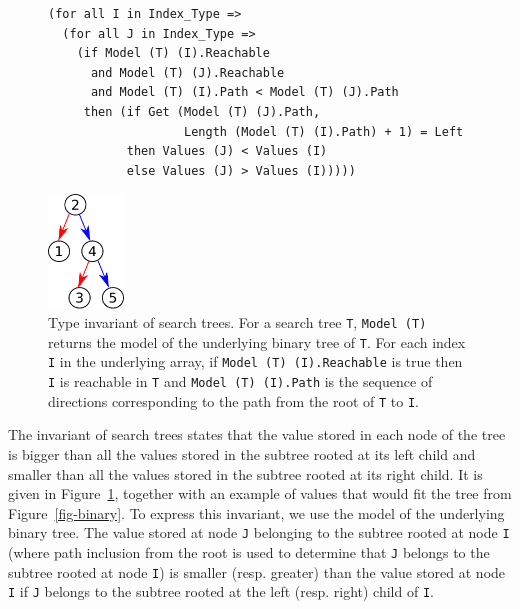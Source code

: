 \documentclass{llncs}
\begin{document}
\begin{figure}[ht]
\hspace{-3mm}
\begin{minipage}[c]{.79\linewidth}
\begin{small}
\begin{lstlisting}
(for all I in Index_Type =>
  (for all J in Index_Type =>
    (if Model (T) (I).Reachable
      and Model (T) (J).Reachable
      and Model (T) (I).Path < Model (T) (J).Path
     then (if Get (Model (T) (J).Path,
                   Length (Model (T) (I).Path) + 1) = Left
           then Values (J) < Values (I)
           else Values (J) > Values (I)))))
\end{lstlisting}
\end{small}
\end{minipage}
\begin{minipage}[c]{.22\linewidth}
\begin{center}
\includegraphics[width=2cm]{search.pdf}
\end{center}
\end{minipage}
\caption{\label{fig-search} Type invariant of search trees. For a search tree \texttt{T},
\texttt{Model (T)} returns the model of the underlying binary tree of \texttt{T}.
For each index \texttt{I} in the underlying
array, if \texttt{Model (T) (I).Reachable} is true then \texttt{I} is reachable
in \texttt{T} and \texttt{Model (T) (I).Path} is the sequence
of directions corresponding to the path from the root of \texttt{T} to \texttt{I}.}
\end{figure}

The invariant of search trees states that the value stored in each node of the
tree is bigger than all the values stored in the subtree rooted at its left
child and smaller than all the values stored in the subtree rooted at its right
child. It is given in Figure~\ref{fig-search}, together with an example of values that would
fit the tree from Figure~\ref{fig-binary}. To express this invariant, we use the model of the
underlying binary tree. The value stored at node \texttt{J} belonging to the subtree
rooted at node \texttt{I} (where path inclusion from the root is used to determine that
\texttt{J} belongs to the subtree rooted at node \texttt{I}) is smaller (resp. greater) than the
value stored at node \texttt{I} if \texttt{J} belongs to the subtree rooted at the left
(resp. right) child of \texttt{I}.
\end{document}
